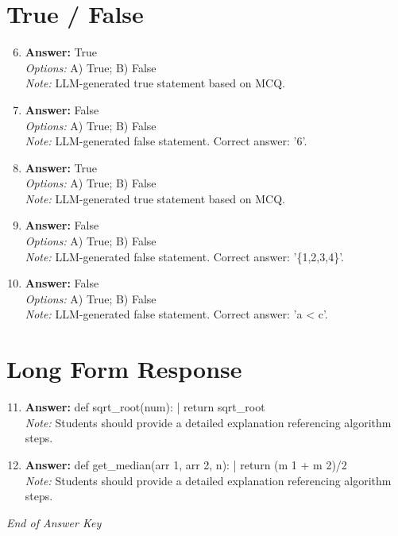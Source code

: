 \documentclass[12pt]{article}
\begin{document}
\section*{True / False}
\begin{enumerate}[label=\arabic*.]
\setcounter{enumi}{5}
\item \textbf{Answer:} True
\\ \textit{Options:} A) True; B) False
\\ \textit{Note:} LLM-generated true statement based on MCQ.
\item \textbf{Answer:} False
\\ \textit{Options:} A) True; B) False
\\ \textit{Note:} LLM-generated false statement. Correct answer: '6'.
\item \textbf{Answer:} True
\\ \textit{Options:} A) True; B) False
\\ \textit{Note:} LLM-generated true statement based on MCQ.
\item \textbf{Answer:} False
\\ \textit{Options:} A) True; B) False
\\ \textit{Note:} LLM-generated false statement. Correct answer: '\{1,2,3,4\}'.
\item \textbf{Answer:} False
\\ \textit{Options:} A) True; B) False
\\ \textit{Note:} LLM-generated false statement. Correct answer: 'a \textless{} c'.
\end{enumerate}

\section*{Long Form Response}
\begin{enumerate}[label=\arabic*.]
\setcounter{enumi}{10}
\item \textbf{Answer:} def sqrt\_root(num): | return sqrt\_root
\\ \textit{Note:} Students should provide a detailed explanation referencing algorithm steps.
\item \textbf{Answer:} def get\_median(arr 1, arr 2, n): | return (m 1 + m 2)/2
\\ \textit{Note:} Students should provide a detailed explanation referencing algorithm steps.
\end{enumerate}

\vfill
\noindent\textit{End of Answer Key}
\end{document}
